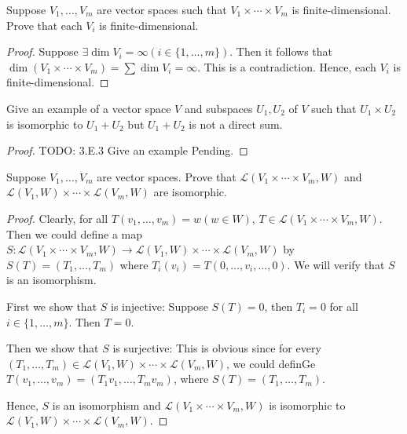 \begin{exercise}
Suppose $V_1, \ldots , V_m$ are vector spaces such that $V_1 \times \cdots \times V_m$ is finite-dimensional. Prove that each $V_i$ is finite-dimensional.
\end{exercise}
\begin{proof}
	Suppose $\exists \operatorname{dim} V_i = \infty (i \in \{1, \ldots , m\})$. Then it follows that $\operatorname{dim} (V_1\times \cdots\times V_m) = \sum \operatorname{dim}V_i = \infty$. This is a contradiction. Hence, each $V_i$ is finite-dimensional.
\end{proof}

\begin{exercise}
Give an example of a vector space $V$ and subspaces $U_1, U_2$ of $V$ such that $U_1 \times U_2$ is isomorphic to $U_1 + U_2$ but $U_1 + U_2$ is not a direct sum.
\end{exercise}
\begin{proof}
	TODO: 3.E.3 Give an example Pending.
\end{proof}

\begin{exercise}
Suppose $V_1, \ldots , V_m$ are vector spaces. Prove that $\mathcal{L}(V_1 \times \cdots\times V_m, W)$ and $\mathcal{L}(V_1, W) \times \cdots \times \mathcal{L}(V_m, W)$ are isomorphic.
\end{exercise}
\begin{proof}
	Clearly, for all $T(v_1, \ldots ,v_m) = w (w\in W)$, $T \in \mathcal{L}(V_1 \times \cdots \times V_m, W)$. Then we could define a map $S: \mathcal{L}(V_1 \times \cdots \times V_m, W) \to \mathcal{L}(V_1, W) \times \cdots \times \mathcal{L}(V_m, W)$ by $S(T) = (T_1, \ldots ,T_m)$ where $T_i(v_i) = T(0, \ldots ,v_i , \ldots , 0)$. We will verify that $S$ is an isomorphism. \par
	First we show that $S$ is injective: Suppose $S(T) = 0$, then $T_i = 0$ for all $i \in \{1, \ldots ,m\}$. Then $T = 0$. \par
	Then we show that $S$ is surjective: This is obvious since for every $(T_1, \ldots , T_m) \in \mathcal{L}(V_1, W) \times \cdots \times \mathcal{L}(V_m, W)$, we could definGe $T(v_1, \ldots ,v_m) = (T_1v_1, \ldots ,T_mv_m)$, where $S(T) = (T_1, \ldots , T_m)$. \par
	Hence, $S$ is an isomorphism and $\mathcal{L}(V_1 \times \cdots\times V_m, W)$ is isomorphic to $\mathcal{L}(V_1, W) \times \cdots\times \mathcal{L}(V_m, W)$.
\end{proof}

